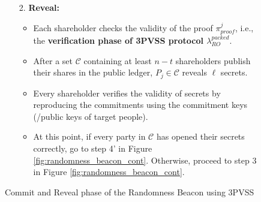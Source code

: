 \begin{figure}[t!]
\begin{tcolorbox}[title=\textbf{Randomness Beacon using 3PVSS, $\Lambda_{RO}^{packed}$}, width=0.9\textwidth, colframe=blue!75!black, colback=blue!10, sharp corners]
\begin{enumerate}
        \item [2.]\textbf{Reveal:}
        \begin{itemize}
            \item Each shareholder checks the validity of the proof 
            $\pi_{proof}^j$, i.e., the \textbf{verification phase of 3PVSS protocol $\lambda_{RO}^{packed}$}.
            \item After a set $\mathcal{C}$ containing at least $n-t$ 
            shareholders publish their shares in the public ledger, 
            $P_j\in\mathcal{C}$ reveals $\ell$ secrets.
            \item Every shareholder verifies the validity of secrets by 
            reproducing the commitments using the commitment keys (/public keys 
            of target people).
            \item At this point, if every party in $\mathcal{C}$ has opened 
            their secrets correctly, go to step 4' in Figure \ref{fig:randomness_beacon_cont}. 
            Otherwise, proceed to step 3 in Figure \ref{fig:randomness_beacon_cont}.
        \end{itemize}
    \end{enumerate}
    \end{tcolorbox}
    \caption{Commit and Reveal phase of the Randomness Beacon using 3PVSS}
    \label{fig:randomness_beacon}
\end{figure}